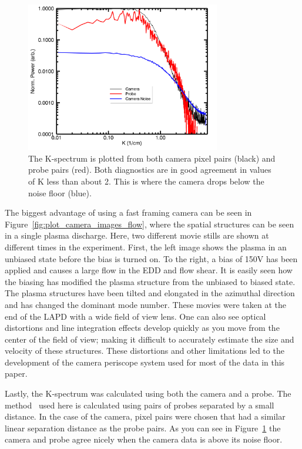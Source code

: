 \documentclass[%
 reprint,
 amsmath,amssymb,
 aps,
]{revtex4-1}
\begin{document}
\begin{figure}[!htbp]
\centerline{}
\includegraphics[width=8.5cm]{plot_k_spectra}
\caption{\label{fig:plot_k_spectra} The K-spectrum is plotted from both camera pixel pairs (black) and probe pairs (red). Both diagnostics are in good agreement in values of K less than about 2. This is where the camera drops below the noise floor (blue). }
\end{figure}


The biggest advantage of using a fast framing camera can be seen in Figure~\ref{fig:plot_camera_images_flow}, where the spatial structures can be seen in a single plasma discharge. Here, two different movie stills are shown at different times in the experiment.  First, the left image shows the plasma in an unbiased state before the bias is turned on.  To the right, a bias of 150V has been applied and causes a large flow in the EDD and flow shear.  It is easily seen how the biasing has modified the plasma structure from the unbiased to biased state.  The plasma structures have been tilted and elongated in the azimuthal direction and has changed the dominant mode number.  These movies were taken at the end of the LAPD with a wide field of view lens. One can also see optical distortions and line integration effects develop quickly as you move from the center of the field of view; making it difficult to accurately estimate the size and velocity of these structures. These distortions and other limitations led to the development of the camera periscope system used for most of the data in this paper.

Lastly, the K-spectrum was calculated using both the camera and a probe. The method~\cite{beall82} used here is calculated using pairs of probes separated by a small distance. In the case of the camera, pixel pairs were chosen that had a similar linear separation distance as the probe pairs. As you can see in Figure~\ref{fig:plot_k_spectra} the camera and probe agree nicely when the camera data is above its noise floor.
 
\end{document}
